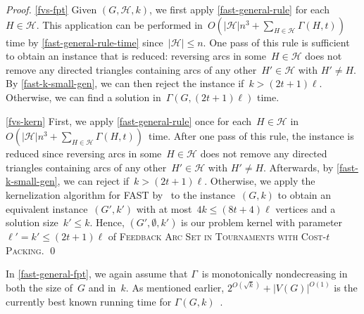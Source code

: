 \documentclass[envcountsame,numbook,smallextended]{svjour3}
\numberwithin{equation}{section}
\numberwithin{figure}{section}
\newcommand{\packing}{\ensuremath{\mathcal H}}
\newcommand{\FASTGP}{\textsc{Feedback Arc Set in Tournaments with  Cost-$t$ Packing}}
\newcommand{\Time}{\ensuremath{\Gamma}}
\begin{document}
\begin{proof}
  \eqref{fvs-fpt} Given $(G,\packing,k)$, we first apply \cref{fast-general-rule} for each~$H\in \packing$.  This application can be performed in~$O(|\packing|n^3 + \sum_{H\in\packing}\Time(H,t))$ time by \cref{fast-general-rule-time} since~$|\packing|\le n$.
  One pass of this rule is sufficient
  to obtain an instance that is reduced:
  reversing arcs in some~$H\in \packing$
  does not remove any directed triangles
  containing arcs of any other~$H'\in\packing$
  with $H'\neq H$.
  By \cref{fast-k-small-gen}, we can then reject the instance if~$k > (2t+1)\ell$.  Otherwise, we can find a solution in~$\Time(G,(2t+1)\ell)$ time.

  \eqref{fvs-kern}
  First, we apply \cref{fast-general-rule}
  once for each~$H\in\packing$ in
  $O(|\packing|n^3 + \sum_{H\in\packing}\Time(H,t))$~time.
  After one pass of this rule,
  the instance is reduced
  since reversing arcs in some~$H\in \packing$
  does not remove any directed triangles
  containing arcs of any other~$H'\in\packing$
  with $H'\neq H$.
  Afterwards, by \cref{fast-k-small-gen}, we can reject if~$k > (2t+1)\ell$.  Otherwise, we apply the kernelization algorithm for \textsc{FAST} by~\citet{PPT16} to the instance~$(G,k)$ to obtain an equivalent instance~$(G',k')$ with at most~$4k\le (8t+4)\ell$ vertices and a solution size~$k'\le k$. 
  Hence,
  $(G',\emptyset,k')$ is our problem kernel 
  with parameter~$\ell'=k'\le(2t+1)\ell$ of \FASTGP{}.  \qed\end{proof}

\noindent In \cref{fast-general-fpt}, we again assume that $\Time$~is monotonically nondecreasing in both the size of~$G$ and in~$k$.  As mentioned earlier, $2^{O(\sqrt{k})}+ |V(G)|^{O(1)}$ is the currently best known running time for $\Time(G,k)$~\cite{KS10}.

\end{document}
